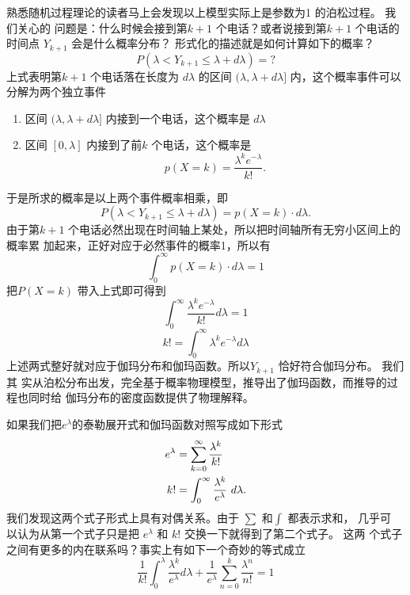 熟悉随机过程理论的读者马上会发现以上模型实际上是参数为1 的泊松过程。 我们关心的
问题是：什么时候会接到第${k+1}$ 个电话？或者说接到第$k+1$ 个电话的时间点
$Y_{k+1}$ 会是什么概率分布？ 形式化的描述就是如何计算如下的概率？
$$ P(\lambda < Y_{k+1} \le \lambda +  d\lambda) = ? $$
上式表明第$k+1$ 个电话落在长度为 $d\lambda$ 的区间 $(\lambda, \lambda +
d\lambda] $ 内，这个概率事件可以分解为两个独立事件
\begin{enumerate}
\item 区间 $(\lambda, \lambda +  d\lambda] $ 内接到一个电话，这个概率是 $d \lambda$
\item 区间 $[0, \lambda]$ 内接到了前$k$ 个电话，这个概率是 
$$ p(X=k) = \frac{\lambda^k e^{-\lambda}}{k!} .$$
\end{enumerate}
于是所求的概率是以上两个事件概率相乘，即
$$ P(\lambda < Y_{k+1} \le \lambda +  d\lambda) = p(X=k) \cdot d \lambda .$$
由于第$k+1$ 个电话必然出现在时间轴上某处，所以把时间轴所有无穷小区间上的概率累
加起来，正好对应于必然事件的概率1，所以有
$$ \int_0^\infty  p(X=k) \cdot d \lambda  = 1 $$
把$P(X=k)$ 带入上式即可得到 
$$ \int_0^\infty \frac{\lambda^k e^{-\lambda}}{k!}  d \lambda  = 1 $$
$$ k! = \int_0^\infty \lambda^k e^{-\lambda} d \lambda $$
上述两式整好就对应于伽玛分布和伽玛函数。所以$Y_{k+1}$ 恰好符合伽玛分布。 我们其
实从泊松分布出发，完全基于概率物理模型，推导出了伽玛函数，而推导的过程也同时给
伽玛分布的密度函数提供了物理解释。

如果我们把$e^\lambda$的泰勒展开式和伽玛函数对照写成如下形式
\begin{align}
e^\lambda & =  \sum_{k=0}^{\infty} {\lambda^k \over k!}  \\
k! & =  \int_0^{\infty} {\lambda^k \over e^\lambda}\ d\lambda. 
\end{align}
我们发现这两个式子形式上具有对偶关系。由于 $\sum$ 和$\int$ 都表示求和， 几乎可
以认为从第一个式子只是把 $e^\lambda$ 和 $k!$ 交换一下就得到了第二个式子。 这两
个式子之间有更多的内在联系吗？事实上有如下一个奇妙的等式成立
\begin{equation}
\label{gamma-e-taylor}
\frac{1}{k!} \int_0^\lambda \frac{\lambda^k}{e^\lambda} d\lambda 
+ \frac{1}{e^\lambda} \sum_{n=0}^k \frac{\lambda^n}{n!} = 1 
\end{equation}

